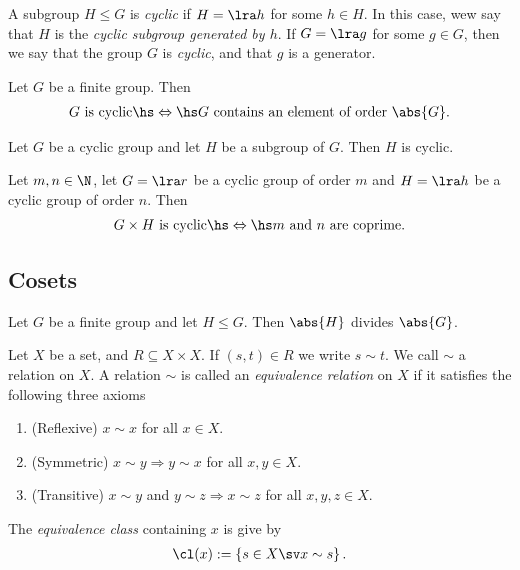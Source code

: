 \documentclass{article}
\begin{document}
\begin{definition}
    A subgroup $H\leq G$ is \emph{cyclic} if $H=\lra h$ for some
    $h\in H$. In this case, wew say that $H$ is the \emph{cyclic subgroup
        generated by $h$}. If $G=\lra g$ for some $g\in G$, then we
    say that the group $G$ is \emph{cyclic}, and that $g$ is a generator.
\end{definition}

\setcounter{theorem}{13}
\begin{lemma}
    Let $G$ be a finite group. Then
    \begin{align*}
        \text{$G$ is cyclic} \hs\Leftrightarrow\hs \text{$G$ contains an element of order $\abs{G}$}.
    \end{align*}
\end{lemma}

\begin{theorem}
    Let $G$ be a cyclic group and let $H$ be a subgroup of $G$. Then
    $H$ is cyclic.
\end{theorem}

\begin{theorem}
    Let $m,n\in\N$, let $G=\lra r$ be a cyclic group of order $m$
    and $H=\lra h$ be a cyclic group of order $n$. Then
    \begin{align*}
        \text{$G\times H$ is cyclic} \hs\Leftrightarrow\hs \text{$m$ and $n$ are coprime.}
    \end{align*}
\end{theorem}

\subsection{Cosets}

\begin{theorem}
    Let $G$ be a finite group and let $H\leq G$.
    Then $\abs{H}$ divides $\abs{G}$.
\end{theorem}

\begin{definition}
    Let $X$ be a set, and $R\subseteq X\times X$.
    If $(s,t)\in R$ we write $s\sim t$. We call $\sim$
    a relation on $X$. A relation $\sim$ is called an
    \emph{equivalence relation} on $X$ if it satisfies
    the following three axioms
    \begin{enumerate}[label=E\arabic*.]
        \item (Reflexive) $x\sim x$ for all $x\in X$.
        \item (Symmetric) $x\sim y \Rightarrow y\sim x$ for all $x,y\in X$.
        \item (Transitive) $x\sim y$ and $y\sim z \Rightarrow x\sim z$ for all $x,y,z\in X$.
    \end{enumerate}
    The \emph{equivalence class} containing $x$ is give by
    \begin{align*}
        \cl(x) := \left\{s\in X \sv x\sim s\right\}.
    \end{align*}
\end{definition}
\end{document}
